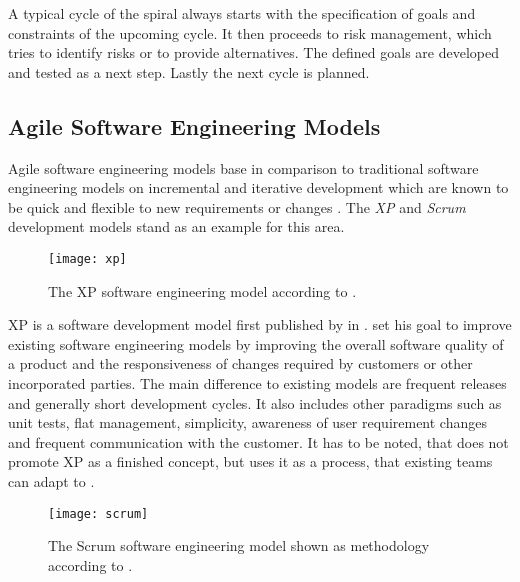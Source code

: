 A typical cycle of the spiral always starts with the specification of goals and
constraints of the upcoming cycle. It then proceeds to risk management, which
tries to identify risks or to provide alternatives. The defined goals are
developed and tested as a next step. Lastly the next cycle is planned.


\subsection{Agile Software Engineering Models} %

Agile software engineering models base in comparison to traditional software
engineering models on incremental and iterative development which are known to
be quick and flexible to new requirements or changes \cite{Beck1999}. The
\emph{\acl{XP}} and \emph{Scrum} development models stand as an example for
this area.

\begin{figure}[htbp]
  \centering
  \texttt{[image: xp]}
  \caption[\acl{XP} Model]
  {The \acl{XP} software engineering model according to \textcite{Beck1999a}.}
\end{figure}

\ac{XP} is a software development model first published by
\citeauthor{Beck1999} \cite{Beck1999a} in \citeyear{Beck1999}.
\citeauthor{Beck1999} set his goal to improve existing software engineering
models by improving the overall software quality of a product and the
responsiveness of changes required by customers or other incorporated parties.
The main difference to existing models are frequent releases and generally
short development cycles. It also includes other paradigms such as unit tests,
flat management, simplicity, awareness of user requirement changes and frequent
communication with the customer. It has to be noted, that \citeauthor{Beck1999}
does not promote \acl{XP} as a finished concept, but uses it as a process, that
existing teams can adapt to \cite{Beck1999}.

\begin{figure}[htbp]
  \centering
  \texttt{[image: scrum]}
  \caption[Scrum Model]
  {The Scrum software engineering model shown as methodology according to
    \textcite{Schwaber1995}.}
\end{figure}

